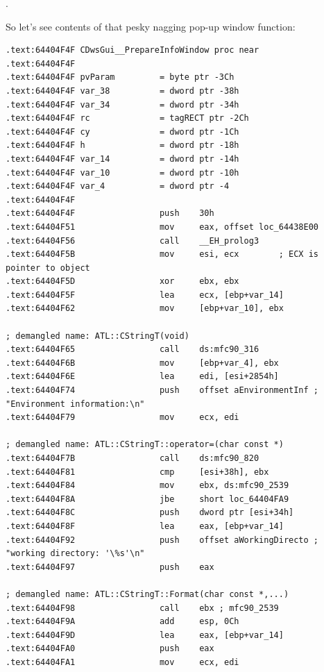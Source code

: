 .

{So let's see contents of that pesky nagging pop-up window function}:

\begin{lstlisting}
.text:64404F4F CDwsGui__PrepareInfoWindow proc near
.text:64404F4F
.text:64404F4F pvParam         = byte ptr -3Ch
.text:64404F4F var_38          = dword ptr -38h
.text:64404F4F var_34          = dword ptr -34h
.text:64404F4F rc              = tagRECT ptr -2Ch
.text:64404F4F cy              = dword ptr -1Ch
.text:64404F4F h               = dword ptr -18h
.text:64404F4F var_14          = dword ptr -14h
.text:64404F4F var_10          = dword ptr -10h
.text:64404F4F var_4           = dword ptr -4
.text:64404F4F
.text:64404F4F                 push    30h
.text:64404F51                 mov     eax, offset loc_64438E00
.text:64404F56                 call    __EH_prolog3
.text:64404F5B                 mov     esi, ecx        ; ECX is pointer to object
.text:64404F5D                 xor     ebx, ebx
.text:64404F5F                 lea     ecx, [ebp+var_14]
.text:64404F62                 mov     [ebp+var_10], ebx

; demangled name: ATL::CStringT(void)
.text:64404F65                 call    ds:mfc90_316    
.text:64404F6B                 mov     [ebp+var_4], ebx
.text:64404F6E                 lea     edi, [esi+2854h]
.text:64404F74                 push    offset aEnvironmentInf ; "Environment information:\n"
.text:64404F79                 mov     ecx, edi

; demangled name: ATL::CStringT::operator=(char const *)
.text:64404F7B                 call    ds:mfc90_820
.text:64404F81                 cmp     [esi+38h], ebx
.text:64404F84                 mov     ebx, ds:mfc90_2539
.text:64404F8A                 jbe     short loc_64404FA9
.text:64404F8C                 push    dword ptr [esi+34h]
.text:64404F8F                 lea     eax, [ebp+var_14]
.text:64404F92                 push    offset aWorkingDirecto ; "working directory: '\%s'\n"
.text:64404F97                 push    eax

; demangled name: ATL::CStringT::Format(char const *,...)
.text:64404F98                 call    ebx ; mfc90_2539
.text:64404F9A                 add     esp, 0Ch
.text:64404F9D                 lea     eax, [ebp+var_14]
.text:64404FA0                 push    eax
.text:64404FA1                 mov     ecx, edi


\end{lstlisting}
